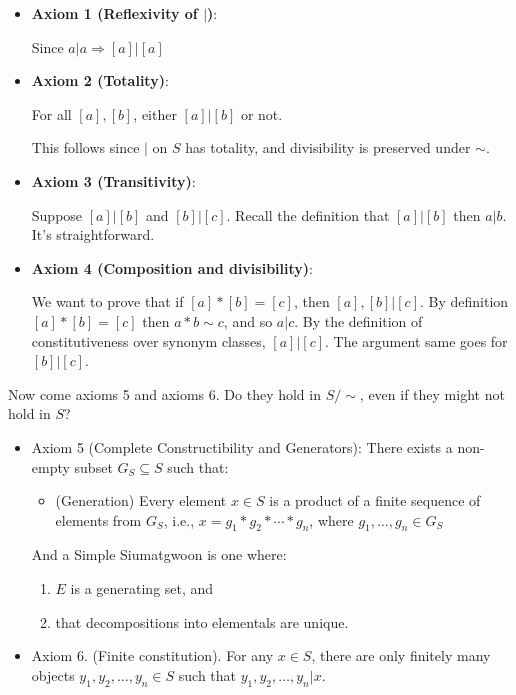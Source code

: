 \begin{itemize}
\item \textbf{Axiom 1 (Reflexivity of $|$)}:
    
    Since $a|a\Rightarrow[a]|[a]$
    
\item \textbf{Axiom 2 (Totality)}:
    
    For all $[a],[b]$, either $[a]|[b]$ or not.
    
    This follows since $|$ on $S$ has totality, and divisibility is preserved under $\sim$.
    
\item \textbf{Axiom 3 (Transitivity)}:
    
    Suppose $[a]|[b]$ and $[b]|[c]$. Recall the definition that $[a]|[b]$ then $a|b$. It's straightforward.
    
\item \textbf{Axiom 4 (Composition and divisibility)}:
    
    We want to prove that if $[a]*[b]=[c]$, then $[a],[b] | [c]$. By definition $[a]*[b]=[c]$ then $a*b\sim c$, and so $a|c$. By the definition of constitutiveness over synonym classes, $[a]|[c]$. The argument same goes for $[b]|[c]$.
\end{itemize}

Now come axioms 5 and axioms 6. Do they hold in $S/\sim$, even if they might not hold in $S$?

\begin{itemize}
\item Axiom 5 (Complete Constructibility and Generators): There exists a non-empty subset $G_{S} \subseteq S$ such that:
    \begin{itemize}
    \item (Generation) Every element $x \in S$ is a product of a finite sequence of elements from $G_S$, i.e., $x = g_1 * g_2 * \cdots * g_n$, where $g_1, \dots, g_n \in G_S$
    \end{itemize}

And a Simple Siumatgwoon is one where:

\begin{enumerate}
\item $E$ is a generating set, and 
\item that decompositions into elementals are unique.
\end{enumerate}

\item Axiom 6. (Finite constitution). For any $x \in S$, there are only finitely many objects $y_1, y_2, \ldots, y_n \in S$ such that $y_1, y_2, \ldots, y_n | x$.
\end{itemize}

